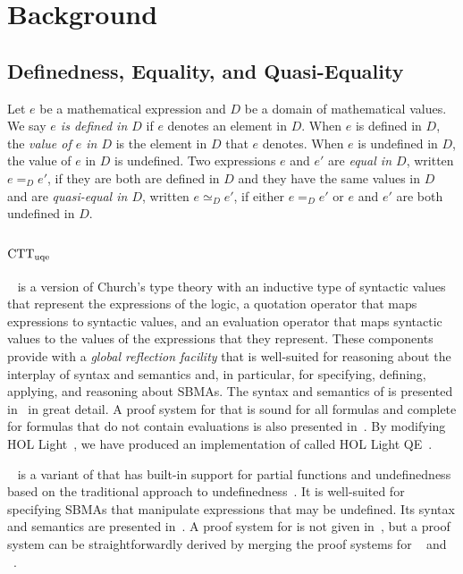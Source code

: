 \documentclass[fleqn]{llncs}
\begin{document}
\fi


\section{Background}

\subsection{Definedness, Equality, and Quasi-Equality}

Let $e$ be a mathematical expression and $D$ be a domain of
mathematical values.  We say \emph{$e$ is defined in $D$} if $e$
denotes an element in $D$.  When $e$ is defined in $D$, the
\emph{value of $e$ in $D$} is the element in $D$ that $e$ denotes.
When $e$ is undefined in $D$, the value of $e$ in $D$ is undefined.
Two expressions $e$ and $e'$ are \emph{equal in $D$}, written $e =_D
e'$, if they are both are defined in $D$ and they have the same values
in $D$ and are \emph{quasi-equal in $D$}, written $e \simeq_D e'$, if
either $e =_D e'$ or $e$ and $e'$ are both undefined in $D$.

\subsection{${\rm CTT}_{\rm uqe}$}

{\churchqe}~\cite{Farmer18} is a version of Church's type theory with
an inductive type of syntactic values that represent the expressions
of the logic, a quotation operator that maps expressions to syntactic
values, and an evaluation operator that maps syntactic values to the
values of the expressions that they represent.  These components
provide {\churchqe} with a \emph{global reflection facility} that is
well-suited for reasoning about the interplay of syntax and semantics
and, in particular, for specifying, defining, applying, and reasoning
about SBMAs.  The syntax and semantics of {\churchqe} is presented
in~\cite{Farmer18} in great detail.  A proof system for {\churchqe}
that is sound for all formulas and complete for formulas that do not
contain evaluations is also presented in~\cite{Farmer18}.  By
modifying HOL Light~\cite{Harrison09}, we have produced an
implementation of {\churchqe} called HOL Light
QE~\cite{CaretteFarmerLaskowski18}.

{\churchuqe}~\cite{Farmer17} is a variant of {\churchqe} that has
built-in support for partial functions and undefinedness based on the
traditional approach to undefinedness~\cite{Farmer04}.  It is
well-suited for specifying SBMAs that manipulate expressions that may
be undefined.  Its syntax and semantics are presented
in~\cite{Farmer17}.  A proof system for {\churchuqe} is not given
in~\cite{Farmer17}, but a proof system can be straightforwardly
derived by merging the proof systems for {\churchqe}~\cite{Farmer18}
and {\qzerou}~\cite{Farmer08a}.
\end{document}
